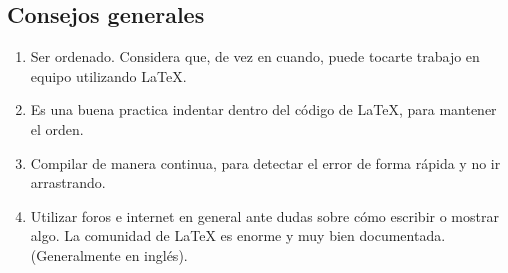 \documentclass[../notes.tex]{subfiles}
\begin{document}
    \subsection{Consejos generales}
    	\begin{enumerate}   
    		\item Ser ordenado. Considera que, de vez en cuando, puede tocarte trabajo en equipo utilizando \LaTeX{}.
            \item Es una buena practica indentar dentro del código de \LaTeX{}, para mantener el orden.
            \item Compilar de manera continua, para detectar el error de forma rápida y no ir arrastrando.
            \item Utilizar foros e internet en general ante dudas sobre cómo escribir o mostrar algo. La comunidad de \LaTeX{} es enorme y muy bien documentada. (Generalmente en inglés).
    	\end{enumerate}
\end{document}
